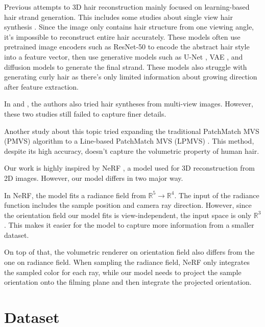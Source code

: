 \documentclass{article}
\begin{document}
Previous attempts to 3D hair reconstruction mainly focused on learning-based hair strand generation. This includes some studies about single view hair synthesis \cite{saito_3d_2018, zheng_hairstep_2023, wu_neuralhdhair_2022, ma_single-view_nodate}. Since the image only contains hair structure from one viewing angle, it's impossible to reconstruct entire hair accurately. These models often use pretrained image encoders such as ResNet-50 \cite{saito_3d_2018} to encode the abstract hair style into a feature vector, then use generative models such as U-Net \cite{zheng_hairstep_2023}, VAE \cite{saito_3d_2018}, and diffusion models \cite{sklyarova_neural_2023} to generate the final strand. These models also struggle with generating curly hair as there's only limited information about growing direction after feature extraction.

In \cite{sklyarova_neural_2023} and \cite{rosu_neural_2022}, the authors also tried hair syntheses from multi-view images. However, these two studies still failed to capture finer details.

Another study about this topic tried expanding the traditional PatchMatch MVS (PMVS) algorithm to a Line-based PatchMatch MVS (LPMVS) \cite{nam_strand-accurate_nodate}. This method, despite its high accuracy, doesn't capture the volumetric property of human hair.

Our work is highly inspired by NeRF \cite{mildenhall_nerf_2020}, a model used for 3D reconstruction from 2D images. However, our model differs in two major way.

In NeRF, the model fits a radiance field from $\mathbb{R}^{5} \rightarrow \mathbb{R}^{4}$. The input of the radiance function includes the sample position and camera ray direction. However, since the orientation field our model fits is view-independent, the input space is only $\mathbb{R}^{3}$. This makes it easier for the model to capture more information from a smaller dataset.

On top of that, the volumetric renderer on orientation field also differs from the one on radiance field. When sampling the radiance field, NeRF only integrates the sampled color for each ray, while our model needs to project the sample orientation onto the filming plane and then integrate the projected orientation.


\section{Dataset}
\end{document}
